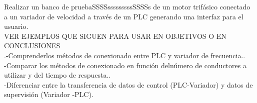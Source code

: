 Realizar un banco de pruebaSSSSsssssssssSSSSs de un motor trifásico conectado a un variador de velocidad a través de un PLC generando una interfaz para el usuario.\\
VER EJEMPLOS QUE SIGUEN PARA USAR EN OBJETIVOS O EN CONCLUSIONES\\
.-Comprenderlos   métodos de   conexionado   entre   PLC   y   variador   de frecuencia..\\-Comparar   los   métodos   de   conexionado   en   función   delnúmero   de conductores a utilizar y del tiempo de respuesta..\\-Diferenciar entre la transferencia de datos de control (PLC-Variador) y datos de supervisión (Variador -PLC).
\newpage